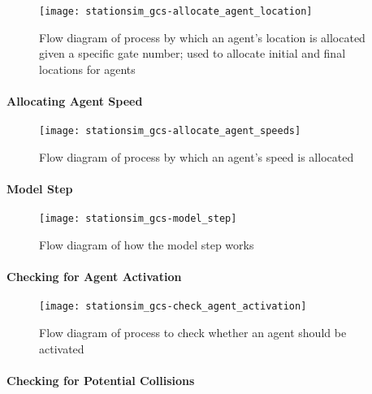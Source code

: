 \begin{figure}[h]
    \centering
    \texttt{[image: stationsim\_gcs-allocate\_agent\_location]}
    \caption{Flow diagram of process by which an agent's location is allocated
    given a specific gate number; used to allocate initial and final locations
    for agents}\label{fig:flow:allocate_agent_location}
\end{figure}

\paragraph{Allocating Agent Speed}\label{para:submodels:agent_speed}

\begin{figure}[h]
    \centering
    \texttt{[image: stationsim\_gcs-allocate\_agent\_speeds]}
    \caption{Flow diagram of process by which an agent's speed is
    allocated}\label{fig:flow:allocate_agent_speed}
\end{figure}

\paragraph{Model Step}\label{para:submodels:model_step}

\begin{figure}[h]
    \centering
    \texttt{[image: stationsim\_gcs-model\_step]}
    \caption{Flow diagram of how the model step
    works}\label{fig:flow:model_step}
\end{figure}

\paragraph{Checking for Agent Activation}\label{para:submodels:agent_activation}

\begin{figure}[h]
    \centering
    \texttt{[image: stationsim\_gcs-check\_agent\_activation]}
    \caption{Flow diagram of process to check whether an agent should be
    activated}\label{fig:flow:check_agent_activation}
\end{figure}

\paragraph{Checking for Potential Collisions}\label{para:submodels:collisions}


